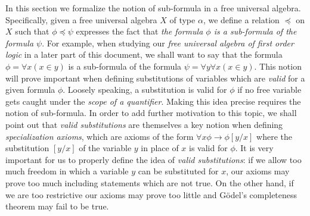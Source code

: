 In this section we formalize the notion of sub-formula in a free
universal algebra. Specifically, given a free universal algebra $X$
of type $\alpha$, we define a relation $\preceq$ on $X$ such that
$\phi\preceq\psi$ expresses the fact that {\em the formula $\phi$ is
a sub-formula of the formula $\psi$}. For example, when studying our
{\em free universal algebra of first order logic} in a later part of
this document, we shall want to say that the formula $\phi=\forall x
(x\in y)$ is a sub-formula of the formula $\psi=\forall y\forall
x(x\in y)$. This notion will prove important when defining
substitutions of variables which are {\em valid} for a given formula
$\phi$. Loosely speaking, a substitution is valid for $\phi$ if no
free variable gets caught under the {\em scope of a quantifier}.
Making this idea precise requires the notion of sub-formula. In
order to add further motivation to this topic, we shall point out
that {\em valid substitutions} are themselves a key notion when
defining {\em specialization axioms}, which are axioms of the form
$\forall x\phi\to\phi[y/x]$ where the substitution $[y/x]$ of the
variable $y$ in place of $x$ is valid for $\phi$. It is very
important for us to properly define the idea of {\em valid
substitutions}: if we allow too much freedom in which a variable $y$
can be substituted for $x$, our axioms may prove too much including
statements which are not true. On the other hand, if we are too
restrictive our axioms may prove too little and G\"odel's
completeness theorem may fail to be true.

